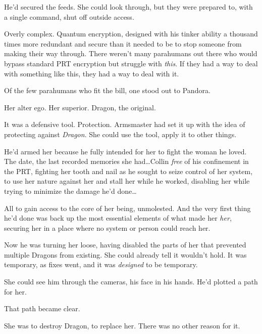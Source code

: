 He'd secured the feeds.  She could look through, but they were prepared to, with a single command, shut off outside access.



Overly complex.  Quantum encryption, designed with his tinker ability a thousand times more redundant and secure than it needed to be to stop someone from making their way through.  There weren't many parahumans out there who would bypass standard PRT encryption but struggle with \emph{this}.  If they had a way to deal with something like this, they had a way to deal with it.



Of the few parahumans who fit the bill, one stood out to Pandora.



Her alter ego.  Her superior.  Dragon, the original.



It was a defensive tool.  Protection.  Armsmaster had set it up with the idea of protecting against \emph{Dragon}.  She could use the tool, apply it to other things.



He'd armed her because he fully intended for her to fight the woman he loved.  The date, the last recorded memories she had\ldots Collin \emph{free} of his confinement in the PRT, fighting her tooth and nail as he sought to seize control of her system, to use her nature against her and stall her while he worked, disabling her while trying to minimize the damage he'd done\ldots



All to gain access to the core of her being, unmolested.  And the very first thing he'd done was back up the most essential elements of what made her \emph{her}, securing her in a place where no system or person could reach her.



Now he was turning her loose, having disabled the parts of her that prevented multiple Dragons from existing.  She could already tell it wouldn't hold.  It was temporary, as fixes went, and it was \emph{designed} to be temporary.



She could see him through the cameras, his face in his hands.  He'd plotted a path for her.



That path became clear.



She was to destroy Dragon, to replace her.  There was no other reason for it.



